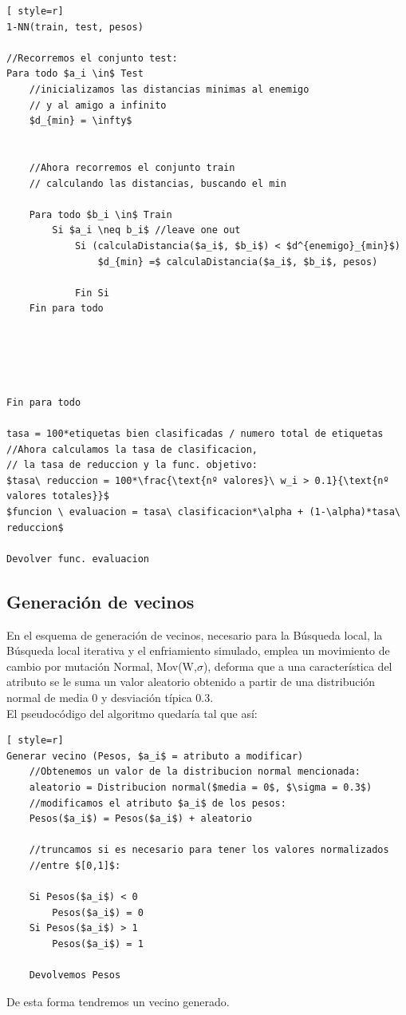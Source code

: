 \begin{lstlisting}[ style=r]
1-NN(train, test, pesos)

//Recorremos el conjunto test:
Para todo $a_i \in$ Test
	//inicializamos las distancias minimas al enemigo
	// y al amigo a infinito
	$d_{min} = \infty$

	
	//Ahora recorremos el conjunto train
	// calculando las distancias, buscando el min
	
	Para todo $b_i \in$ Train
		Si $a_i \neq b_i$ //leave one out
			Si (calculaDistancia($a_i$, $b_i$) < $d^{enemigo}_{min}$)
				$d_{min} =$ calculaDistancia($a_i$, $b_i$, pesos)
			
			Fin Si
	Fin para todo
	
	
	
	

Fin para todo

tasa = 100*etiquetas bien clasificadas / numero total de etiquetas
//Ahora calculamos la tasa de clasificacion,
// la tasa de reduccion y la func. objetivo:
$tasa\ reduccion = 100*\frac{\text{nº valores}\ w_i > 0.1}{\text{nº valores totales}}$
$funcion \ evaluacion = tasa\ clasificacion*\alpha + (1-\alpha)*tasa\ reduccion$

Devolver func. evaluacion
\end{lstlisting}


\subsection{Generación de vecinos}
En el esquema de generación de vecinos, necesario para la Búsqueda local, la Búsqueda local iterativa y el enfriamiento simulado, emplea un movimiento de cambio por mutación Normal, Mov(W,$\sigma$), deforma que a una característica del atributo se le suma un valor aleatorio obtenido a partir de una distribución normal de media 0 y desviación típica 0.3.\\ 

El pseudocódigo del algoritmo quedaría tal que así:

\begin{lstlisting}[ style=r]
Generar vecino (Pesos, $a_i$ = atributo a modificar)
	//Obtenemos un valor de la distribucion normal mencionada:
	aleatorio = Distribucion normal($media = 0$, $\sigma = 0.3$)
	//modificamos el atributo $a_i$ de los pesos:
	Pesos($a_i$) = Pesos($a_i$) + aleatorio
	
	//truncamos si es necesario para tener los valores normalizados 
	//entre $[0,1]$:
	
	Si Pesos($a_i$) < 0
		Pesos($a_i$) = 0
	Si Pesos($a_i$) > 1
		Pesos($a_i$) = 1
		
	Devolvemos Pesos
\end{lstlisting}
De esta forma tendremos un vecino generado.

